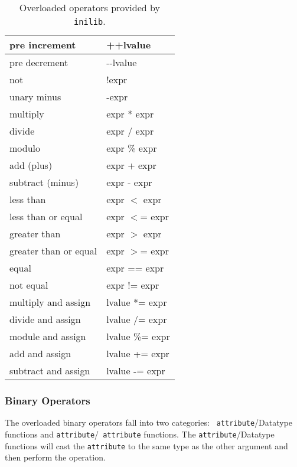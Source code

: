 \begin{table}
  \begin{center}
    \begin{tabular}[ht!]{| l | l |} \hline
      pre increment & ++lvalue \\ \hline
      pre decrement & -{}-{}lvalue \\ \hline
      not & !expr \\ \hline
      unary minus & -expr \\ \hline
      multiply & expr * expr \\ \hline
      divide & expr / expr \\ \hline
      modulo & expr \% expr \\ \hline
      add (plus) & expr + expr \\ \hline
      subtract (minus) & expr - expr \\ \hline
      less than & expr $<$ expr \\ \hline
      less than or equal & expr $<$= expr \\ \hline
      greater than & expr $>$ expr \\ \hline
      greater than or equal & expr $>$= expr \\ \hline
      equal & expr ={}={} expr \\ \hline
      not equal & expr !={} expr \\ \hline
      multiply and assign & lvalue *= expr \\ \hline
      divide and assign & lvalue /= expr \\ \hline
      module and assign & lvalue \%= expr \\ \hline
      add and assign & lvalue += expr \\ \hline
      subtract and assign & lvalue -= expr \\ \hline
    \end{tabular}
  \end{center}
  \caption{Overloaded operators provided by {\tt inilib}.}
  \label{tbl:overloaded}
\end{table}

\subsubsection{Binary Operators}

The overloaded binary operators fall into two categories: {\tt
  attribute}/{\sc Datatype} functions and {\tt attribute}/{\tt
  attribute} functions.  The {\tt attribute}/{\sc Datatype} functions
will cast the {\tt attribute} to the same type as the other argument
and then perform the operation.

